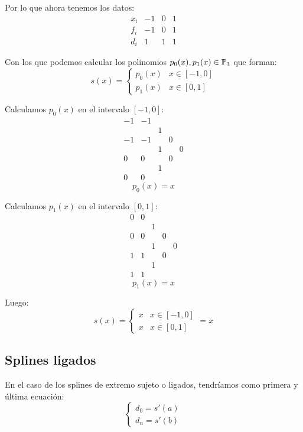 \noindent
Por lo que ahora tenemos los datos:
$$\begin{array}{c|ccc}
        x_i & -1 & 0 & 1 \\
        \hline
        f_i & -1 & 0 & 1 \\
        \hline
        d_i & 1  & 1 & 1
    \end{array}$$

\noindent
Con los que podemos calcular los polinomios $p_0(x), p_1(x) \in \mathbb{P}_3$ que forman:
$$s(x) = \left\{ \begin{array}{ll}
        p_0(x) & x \in [-1, 0] \\
        p_1(x) & x \in [0,1]
    \end{array} \right.$$

\noindent
Calculamos $p_0(x)$ en el intervalo $[-1,0]$:
$$\begin{array}{c|cccc}
        -1 & -1 &   &   &   \\
           &    & 1 &   &   \\
        -1 & -1 &   & 0 &   \\
           &    & 1 &   & 0 \\
        0  & 0  &   & 0 &   \\
           &    & 1 &   &   \\
        0  & 0  &   &   &
    \end{array}$$
$$p_0(x) = x$$

\bigskip
\noindent
Calculamos $p_1(x)$ en el intervalo $[0,1]$:
$$\begin{array}{c|cccc}
        0 & 0 &   &   &   \\
          &   & 1 &   &   \\
        0 & 0 &   & 0 &   \\
          &   & 1 &   & 0 \\
        1 & 1 &   & 0 &   \\
          &   & 1 &   &   \\
        1 & 1 &   &   &
    \end{array}$$
$$p_1(x) = x$$

Luego:
$$s(x) = \left\{ \begin{array}{ll}
        x & x \in [-1, 0] \\
        x & x \in [0,1]
    \end{array} \right. = x$$

\subsection{Splines ligados}
\noindent
En el caso de los splines de extremo sujeto o ligados, tendríamos como primera y última ecuación:
$$\left\{ \begin{array}{c}
        d_0 = s'(a) \\
        d_n = s'(b)
    \end{array}\right.$$

